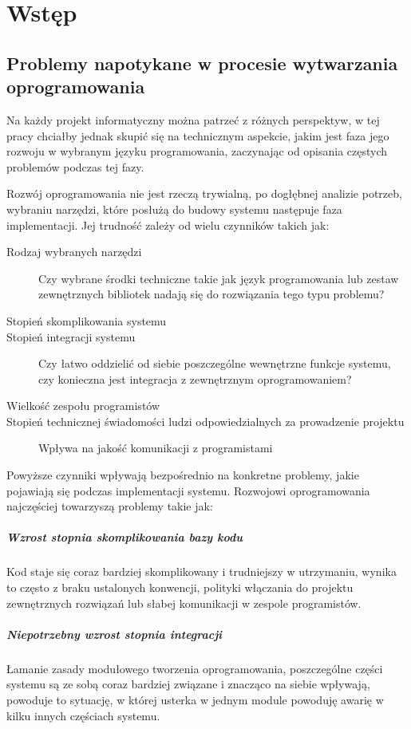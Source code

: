 \chapter[Wstęp]{Wstęp}
	\section{Problemy napotykane w procesie wytwarzania oprogramowania}
	  Na każdy projekt informatyczny można patrzeć z różnych perspektyw, w tej pracy chciałby jednak skupić się na technicznym aspekcie, jakim jest faza jego rozwoju w wybranym języku programowania, zaczynając od opisania częstych problemów podczas tej fazy.
	  
	  Rozwój oprogramowania nie jest rzeczą trywialną, po dogłębnej analizie potrzeb, wybraniu narzędzi, które posłużą do budowy systemu następuje faza implementacji. Jej trudność zależy od wielu czynników takich jak:
	  
	  \begin{description}
	    \item[Rodzaj wybranych narzędzi] Czy wybrane środki techniczne takie jak język programowania lub zestaw zewnętrznych bibliotek nadają się do rozwiązania tego typu problemu?
	    \item[Stopień skomplikowania systemu]
	    \item[Stopień integracji systemu] Czy łatwo oddzielić od siebie poszczególne wewnętrzne funkcje systemu, czy konieczna jest integracja z zewnętrznym oprogramowaniem?
	    \item[Wielkość zespołu programistów]
	    \item[Stopień technicznej świadomości ludzi odpowiedzialnych za prowadzenie projektu] Wpływa na jakość komunikacji z programistami
	  \end{description}
	  
	  Powyższe czynniki wpływają bezpośrednio na konkretne problemy, jakie pojawiają się podczas implementacji systemu. Rozwojowi oprogramowania najczęściej towarzyszą problemy takie jak:
	  
	  \paragraph{Wzrost stopnia skomplikowania bazy kodu}
	    Kod staje się coraz bardziej skomplikowany i trudniejszy w utrzymaniu, wynika to często z braku ustalonych konwencji, polityki włączania do projektu zewnętrznych rozwiązań lub słabej komunikacji w zespole programistów.
	  \paragraph{Niepotrzebny wzrost stopnia integracji}
	    Łamanie zasady modułowego tworzenia oprogramowania, poszczególne części systemu są ze sobą coraz bardziej związane i znacząco na siebie wpływają, powoduje to sytuację, w której usterka w jednym module powoduję awarię w kilku innych częściach systemu.
